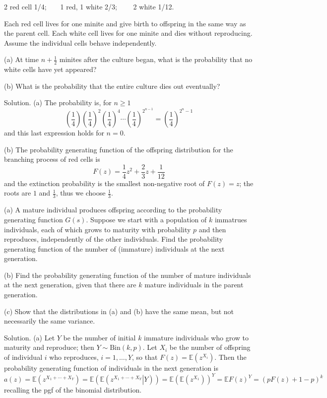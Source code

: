 2 red cell 1/4;\ \ \ \ 1 red, 1 white 2/3; \ \ \ \ 2 white 1/12.

Each red cell lives for one minite and give birth to offspring in the same way as the parent cell. Each white cell lives for one minite and dies without reproducing. Assume the individual cells behave independently. 

(a) At time $n+\frac 12$ minites after the culture began, what is the probability that no white cells have yet appeared?

(b) What is the probability that the entire culture dies out eventually?



Solution. (a) The probability is, for $n\geq 1$
\begin{equation}
\left(\frac 14\right)\left(\frac 14\right)^2\left(\frac 14\right)^4\cdots\left(\frac 14\right)^{2^{n-1}} = \left(\frac 14\right)^{2^n-1}
\end{equation}
and this last expression holds for $n=0$.

(b) The probability generating function of the offspring distribution for the branching process of red cells is
\begin{equation}
F(z)=\frac 14z^2+\frac 23z+\frac{1}{12}
\end{equation}
and the extinction probability is the smallest non-negative root of $F(z)=z$; the roots are $1$ and $\frac 13$, thus we choose $\frac 13$.


\item (a) A mature individual produces offspring according to the probability generating function $G(s)$. Suppose we start with a population of $k$ immatrues individuals, each of which grows to maturity with probability $p$ and then reproduces, independently of the other individuals. Find the probability generating function of the number of (immature) individuals at the next generation.

(b) Find the probability generating function of the number of mature individuals at the next generation, given that there are $k$ mature individuals in the parent generation.

(c) Show that the distributions in (a) and (b) have the same mean, but not necessarily the same variance.



Solution. (a) Let $Y$ be the number of initial $k$ immature individuals who grow to maturity and reproduce; then $Y\sim\text{Bin}(k,p)$. Let $X_i$ be the number of offspring of individual $i$ who reproduces, $i=1,\dots,Y$, so that $F(z)=\mathbb{E}\left(z^{X_i}\right)$. Then the probability generating function of individuals in the next generation is
\begin{equation}
a(z) = \mathbb{E}\left(z^{X_1+\cdots+X_Y}\right) = \mathbb{E}\left(\mathbb{E}\left(\left.z^{X_1+\cdots+X_Y}\right|Y\right)\right) = \mathbb{E}\left(\mathbb{E}\left(z^{X_1}\right)\right)^Y = \mathbb{E}F(z)^Y = (pF(z)+1-p)^k
\end{equation}
recalling the pgf of the binomial distribution.

